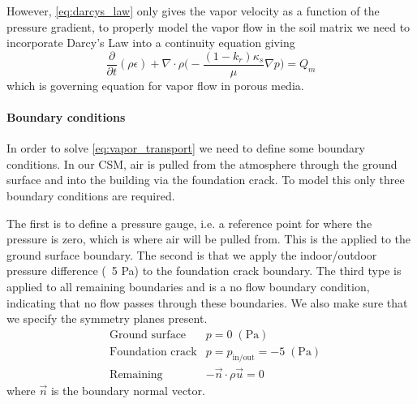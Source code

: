 However, \eqref{eq:darcys_law} only gives the vapor velocity as a function of the pressure gradient, to properly model the vapor flow in the soil matrix we need to incorporate Darcy's Law into a continuity equation giving
\begin{equation}\label{eq:vapor_transport}
  \frac{\partial}{\partial t} (\rho \epsilon) + \nabla \cdot \rho \Big( -\frac{(1-k_r) \kappa_s}{\mu} \nabla p \Big) = Q_m
\end{equation}
which is governing equation for vapor flow in porous media.\par

\paragraph{Boundary conditions}

In order to solve \eqref{eq:vapor_transport} we need to define some boundary conditions.
In our CSM, air is pulled from the atmosphere through the ground surface and into the building via the foundation crack.
To model this only three boundary conditions are required.\par

The first is to define a pressure gauge, i.e. a reference point for where the pressure is zero, which is where air will be pulled from.
This is the applied to the ground surface boundary.
The second is that we apply the indoor/outdoor pressure difference (~5 Pa) to the foundation crack boundary.
The third type is applied to all remaining boundaries and is a no flow boundary condition, indicating that no flow passes through these boundaries.
We also make sure that we specify the symmetry planes present.
\begin{align}
  &\text{Ground surface} &p = 0 \; \mathrm{(Pa)} \\
  &\text{Foundation crack} &p = p_\mathrm{in/out} = -5 \; \mathrm{(Pa)} \\
  &\text{Remaining} &-\vec{n}\cdot\rho\vec{u} = 0
\end{align}
where $\vec{n}$ is the boundary normal vector.\par
